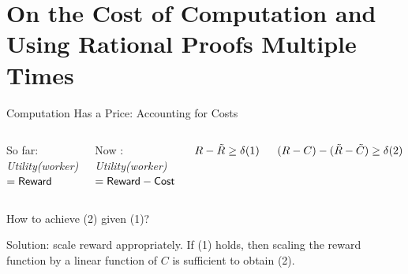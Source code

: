\section{On the Cost of Computation and Using Rational Proofs Multiple Times}

\begin{frame}{Computation Has a Price: Accounting for Costs}
	\begin{columns}
	\begin{block}{So far:}
		\textit{Utility(worker)} $ = \mathsf{Reward}$
	\end{block}
	\begin{block}{Now :}
		\textit{Utility(worker)} $= \mathsf{Reward} - \mathsf{Cost}$
	\end{block}
	\begin{block}{}
		$R - \tilde{R} \geq \delta \hspace*{\fill} (1) \hspace*{\fill}$
	\end{block}
	\begin{block}{}
		$(R-C) - (\tilde{R}-\tilde{C}) \geq \delta \hspace*{\fill} (2) \hspace*{\fill}$			
	\end{block}
	\end{columns}
	\bigskip
\begin{block}{How to achieve (2) given (1)?}
\end{block}
	\begin{block}{Solution: scale reward appropriately.}
		If (1) holds, then scaling the reward function by a linear function of $C$ is sufficient to obtain (2).
	\end{block}
\end{frame}

